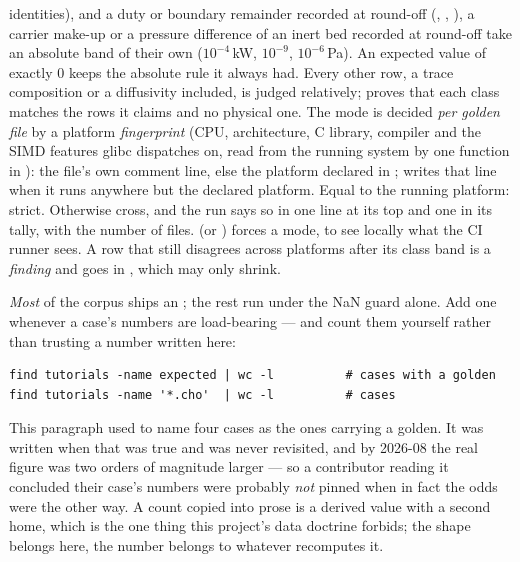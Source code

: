 \documentclass[11pt,a4paper]{article}
\begin{document}
\begin{keyidea}
identities), and a duty or boundary remainder recorded at round-off
(, , ), a carrier
make-up or a pressure difference of an inert bed recorded at round-off take an
absolute band of their own ($10^{-4}$\,kW, $10^{-9}$, $10^{-6}$\,Pa).  An expected value of exactly $0$ keeps the absolute rule it
always had.  Every other row, a trace composition or a diffusivity included, is
judged relatively;  proves that each class matches
the rows it claims and no physical one.  The mode is decided \emph{per golden file} by a platform
\emph{fingerprint} (CPU, architecture, C library, compiler and the SIMD features
glibc dispatches on, read from the running system by one function in
): the file's own  comment
line, else the platform declared in ;
 writes that line when it runs anywhere but the declared platform.
Equal to the running platform: strict.  Otherwise cross, and the run says so in
one line at its top and one in its tally, with the number of files.
 (or ) forces a mode, to see locally
what the CI runner sees.  A row that still disagrees across platforms after its
class band is a \emph{finding} and goes in
, which may only shrink.
\end{keyidea}

\emph{Most} of the corpus ships an ; the rest run under the
NaN guard alone.  Add one whenever a case's numbers are load-bearing --- and
count them yourself rather than trusting a number written here:

\begin{lstlisting}
find tutorials -name expected | wc -l          # cases with a golden
find tutorials -name '*.cho'  | wc -l          # cases
\end{lstlisting}

\noindent This paragraph used to name four cases as the ones carrying a
golden.  It was written when that was true and was never revisited, and by
2026-08 the real figure was two orders of magnitude larger --- so a
contributor reading it concluded their case's numbers were probably
\emph{not} pinned when in fact the odds were the other way.  A count copied
into prose is a derived value with a second home, which is the one thing
this project's data doctrine forbids; the shape belongs here, the number
belongs to whatever recomputes it.
\end{document}

